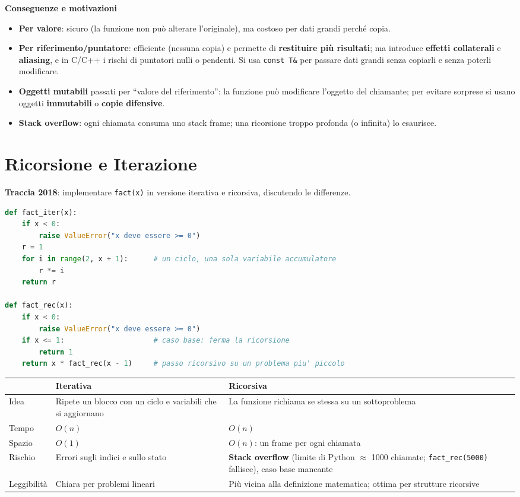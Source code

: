 \textbf{Conseguenze e motivazioni}
\begin{itemize}
    \item \textbf{Per valore}: sicuro (la funzione non può alterare l'originale), ma costoso per dati grandi perché copia.
    \item \textbf{Per riferimento/puntatore}: efficiente (nessuna copia) e permette di \textbf{restituire più risultati}; ma introduce \textbf{effetti collaterali} e \textbf{aliasing}, e in C/C++ i rischi di puntatori nulli o pendenti. Si usa \texttt{const T\&} per passare dati grandi senza copiarli e senza poterli modificare.
    \item \textbf{Oggetti mutabili} passati per ``valore del riferimento'': la funzione può modificare l'oggetto del chiamante; per evitare sorprese si usano oggetti \textbf{immutabili} o \textbf{copie difensive}.
    \item \textbf{Stack overflow}: ogni chiamata consuma uno stack frame; una ricorsione troppo profonda (o infinita) lo esaurisce.
\end{itemize}

\section{Ricorsione e Iterazione}
\textbf{Traccia 2018}: implementare \texttt{fact(x)} in versione iterativa e ricorsiva, discutendo le differenze.

\begin{lstlisting}[language=Python, caption={Fattoriale: versione iterativa e ricorsiva}]
def fact_iter(x):
    if x < 0:
        raise ValueError("x deve essere >= 0")
    r = 1
    for i in range(2, x + 1):      # un ciclo, una sola variabile accumulatore
        r *= i
    return r

def fact_rec(x):
    if x < 0:
        raise ValueError("x deve essere >= 0")
    if x <= 1:                     # caso base: ferma la ricorsione
        return 1
    return x * fact_rec(x - 1)     # passo ricorsivo su un problema piu' piccolo
\end{lstlisting}

\begin{center}
\small
\begin{tabularx}{\textwidth}{@{}>{\raggedright\arraybackslash}p{3cm}XX@{}}
\toprule
 & \textbf{Iterativa} & \textbf{Ricorsiva} \\
\midrule
Idea & Ripete un blocco con un ciclo e variabili che si aggiornano & La funzione richiama se stessa su un sottoproblema \\
Tempo & $O(n)$ & $O(n)$ \\
Spazio & $O(1)$ & $O(n)$: un frame per ogni chiamata \\
Rischio & Errori sugli indici e sullo stato & \textbf{Stack overflow} (limite di Python $\approx$ 1000 chiamate; \texttt{fact\_rec(5000)} fallisce), caso base mancante \\
Leggibilità & Chiara per problemi lineari & Più vicina alla definizione matematica; ottima per strutture ricorsive \\
\bottomrule
\end{tabularx}
\end{center}

